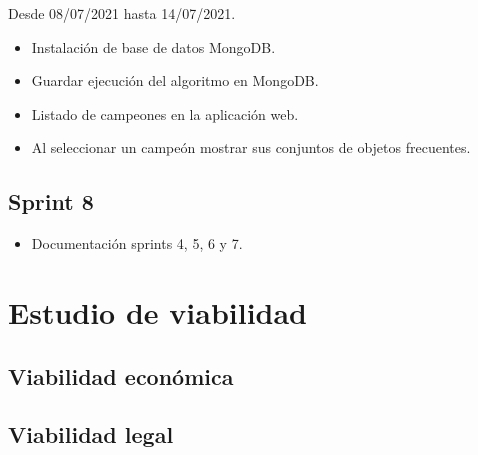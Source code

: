 Desde 08/07/2021 hasta 14/07/2021.

\begin{itemize}
    \item Instalación de base de datos MongoDB.
    \item Guardar ejecución del algoritmo en MongoDB.
    \item Listado de campeones en la aplicación web.
    \item Al seleccionar un campeón mostrar sus conjuntos de objetos frecuentes.
\end{itemize}

\subsection{Sprint 8}

\begin{itemize}
    \item Documentación sprints 4, 5, 6 y 7.
\end{itemize}

\section{Estudio de viabilidad}

\subsection{Viabilidad económica}

\subsection{Viabilidad legal}


